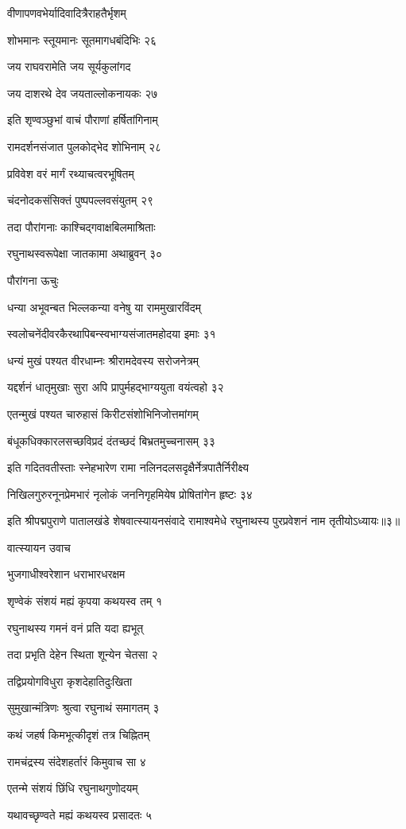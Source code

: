 वीणापणवभेर्यादिवादित्रैराहतैर्भृशम्

शोभमानः स्तूयमानः सूतमागधबंदिभिः २६

जय राघवरामेति जय सूर्यकुलांगद

जय दाशरथे देव जयताल्लोकनायकः २७

इति शृण्वञ्छुभां वाचं पौराणां हर्षितांगिनाम्

रामदर्शनसंजात पुलकोद्भेद शोभिनाम् २८

प्रविवेश वरं मार्गं रथ्याचत्वरभूषितम्

चंदनोदकसंसिक्तं पुष्पपल्लवसंयुतम् २९

तदा पौरांगनाः काश्चिद्गवाक्षबिलमाश्रिताः

रघुनाथस्वरूपेक्षा जातकामा अथाब्रुवन् ३०

पौरांगना ऊचुः

धन्या अभूवन्बत भिल्लकन्या वनेषु या राममुखारविंदम्

स्वलोचनेंदीवरकैरथापिबन्स्वभाग्यसंजातमहोदया इमाः ३१

धन्यं मुखं पश्यत वीरधाम्नः श्रीरामदेवस्य सरोजनेत्रम्

यद्दर्शनं धातृमुखाः सुरा अपि प्रापुर्महद्भाग्ययुता वयंत्वहो ३२

एतन्मुखं पश्यत चारुहासं किरीटसंशोभिनिजोत्तमांगम्

बंधूकधिक्कारलसच्छविप्रदं दंतच्छदं बिभ्रतमुच्चनासम् ३३

इति गदितवतीस्ताः स्नेहभारेण रामा नलिनदलसदृक्षैर्नेत्रपातैर्निरीक्ष्य

निखिलगुरुरनूनप्रेमभारं नृलोकं जननिगृहमियेष प्रोषितांगेन हृष्टः ३४

इति श्रीपद्मपुराणे पातालखंडे शेषवात्स्यायनसंवादे रामाश्वमेधे रघुनाथस्य पुरप्रवेशनं नाम तृतीयोऽध्यायः॥३॥


वात्स्यायन उवाच

भुजगाधीश्वरेशान धराभारधरक्षम

शृण्वेकं संशयं मह्यं कृपया कथयस्व तम् १

रघुनाथस्य गमनं वनं प्रति यदा ह्यभूत्

तदा प्रभृति देहेन स्थिता शून्येन चेतसा २

तद्विप्रयोगविधुरा कृशदेहातिदुःखिता

सुमुखान्मंत्रिणः श्रुत्वा रघुनाथं समागतम् ३

कथं जहर्ष किमभूत्कीदृशं तत्र चिह्नितम्

रामचंद्रस्य संदेशहर्तारं किमुवाच सा ४

एतन्मे संशयं छिंधि रघुनाथगुणोदयम्

यथावच्छृण्वते मह्यं कथयस्व प्रसादतः ५

